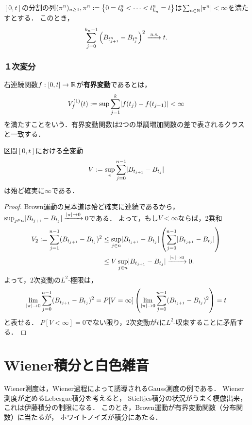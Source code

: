 \documentclass[uplatex,dvipdfmx]{jsreport}
\begin{document}
\begin{proposition}[2次変動の概収束]
    $[0,t]$の分割の列$(\pi^n)_{n\ge 1},\pi^n:=\left\{0=t^n_0<\cdots<t^n_{k_n}=t\right\}$は$\sum_{n\in\mathbb{N}}\lvert\pi^n\rvert<\infty$を満たすとする．
    このとき，
    \[\sum^{k_n-1}_{j=0}\left(B_{t^n_{j+1}}-B_{t^n_j}\right)^2\xrightarrow{\;\mathrm{a.s.}}t.\]
\end{proposition}

\subsubsection{１次変分}

\begin{definition}
    右連続関数$f:[0,t]\to\mathbb{R}$が\textbf{有界変動}であるとは，
    \[V_f^{(1)}(t):=\sup\sum^k_{j=1}\lvert f(t_j)-f(t_{j-1})\rvert<\infty\]
    を満たすことをいう．有界変動関数は2つの単調増加関数の差で表されるクラスと一致する．
\end{definition}


\begin{corollary}[全変動の発散]
    区間$[0,t]$における全変動
    \[V:=\sup_{\pi}\sum^{n-1}_{j=0}\lvert B_{t_{j+1}}-B_{t_j}\rvert\]
    は殆ど確実に$\infty$である．
\end{corollary}
\begin{proof}
    Brown運動の見本道は殆ど確実に連続であるから，$\sup_{j\in n}\lvert B_{t_{j+1}}-B_{t_j}\rvert\xrightarrow{\lvert\pi\rvert\to0}0$である．
    よって，もし$V<\infty$ならば，2乗和
    \begin{align*}
        V_2:=\sum^{n-1}_{j=1}(B_{t_{j+1}}-B_{t_j})^2&\le\sup_{j\in n}\lvert B_{t_{j+1}}-B_{t_j}\rvert\left(\sum^{n-1}_{j=0}\lvert B_{t_{j+1}}-B_{t_j}\rvert\right)\\
        &\le V\sup_{j\in n}\lvert B_{t_{j+1}}-B_{t_j}\rvert\xrightarrow{\lvert\pi\rvert\to0}0.
    \end{align*}
    よって，2次変動の$L^2$-極限は，
    \[\lim_{\lvert\pi\rvert\to0}\sum^{n-1}_{j=0}(B_{t_{j+1}}-B_{t_j})^2=P[V=\infty]\left(\lim_{\lvert\pi\rvert\to0}\sum^{n-1}_{j=0}(B_{t_{j+1}}-B_{t_j})^2\right)=t\]
    と表せる．
    $P[V<\infty]=0$でない限り，2次変動が$t$に$L^2$-収束することに矛盾する．
\end{proof}



\section{Wiener積分と白色雑音}\label{sec-Wiener-integral}

\begin{tcolorbox}[colframe=ForestGreen, colback=ForestGreen!10!white,breakable,colbacktitle=ForestGreen!40!white,coltitle=black,fonttitle=\bfseries\sffamily,
    title=]
    Wiener測度は，Wiener過程によって誘導されるGauss測度の例である．
    Wiener測度が定めるLebesgue積分を考えると，
    Stieltjes積分の状況がうまく模倣出来，これは伊藤積分の制限になる．
    このとき，Brown運動が有界変動関数（分布関数）に当たるが，
    ホワイトノイズが積分にあたる．
\end{tcolorbox}
\end{document}
